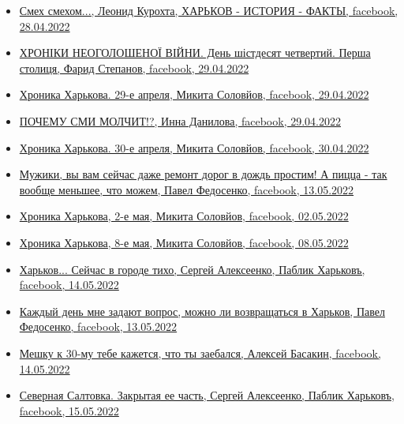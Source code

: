 \begin{itemize}
\item \hyperlink{28_04_2022.fb.fb_group.harkov_istoria_fakty.1.smeh_smehom}{%
Смех смехом..., Леонид Курохта, ХАРЬКОВ - ИСТОРИЯ - ФАКТЫ, facebook, 28.04.2022%
}

\item \hyperlink{29_04_2022.fb.fb_group.story_kiev_ua.1.hronika_harkov}{%
ХРОНІКИ НЕОГОЛОШЕНОЇ ВІЙНИ. День шістдесят четвертий. Перша столиця, Фарид Степанов, facebook, 29.04.2022%
}

\item \hyperlink{29_04_2022.fb.solovjov_mikita.harkov.demsokyra.1.hronika}{%
Хроника Харькова. 29-е апреля, Микита Соловйов, facebook, 29.04.2022%
}

\item \hyperlink{29_04_2022.fb.danilova_inna.harkov.1.smi_molchit}{%
ПОЧЕМУ СМИ МОЛЧИТ!?, Инна Данилова, facebook, 29.04.2022%
}

\item \hyperlink{30_04_2022.fb.solovjov_mikita.harkov.demsokyra.1.hronika}{%
Хроника Харькова. 30-е апреля, Микита Соловйов, facebook, 30.04.2022%
}

\item \hyperlink{30_04_2022.fb.fedosenko_pavel.harkov.newsroom.1.kommunalschiki}{%
Мужики, вы вам сейчас даже ремонт дорог в дождь простим! А пицца - так вообще меньшее, что можем, %
Павел Федосенко, facebook, 13.05.2022%
}

\item \hyperlink{02_05_2022.fb.solovjov_mikita.harkov.demsokyra.1.hronika}{%
Хроника Харькова, 2-е мая, Микита Соловйов, facebook, 02.05.2022%
}


\item \hyperlink{08_05_2022.fb.solovjov_mikita.harkov.demsokyra.1.hronika}{%
Хроника Харькова, 8-е мая, Микита Соловйов, facebook, 08.05.2022%
}

\item \hyperlink{14_05_2022.fb.fb_group.pablik_harkov.1.harkov_tiho}{%
Харьков... Сейчас в городе тихо, Сергей Алексеенко, Паблик Харьковъ, facebook, 14.05.2022%
}

\item \hyperlink{13_05_2022.fb.fedosenko_pavel.harkov.newsroom.1.vopros_harkov}{%
Каждый день мне задают вопрос, можно ли возвращаться в Харьков, Павел Федосенко, facebook, 13.05.2022%
}

\item \hyperlink{14_05_2022.fb.basakin_aleksej.harkov.newsroom.1.meshok}{%
Мешку к 30-му тебе кажется, что ты заебался, Алексей Басакин, facebook, 14.05.2022%
}

\item \hyperlink{15_05_2022.fb.fb_group.pablik_harkov.1.saltovka}{%
Северная Салтовка. Закрытая ее часть, Сергей Алексеенко, Паблик Харьковъ, facebook, 15.05.2022%
}

\end{itemize} %

